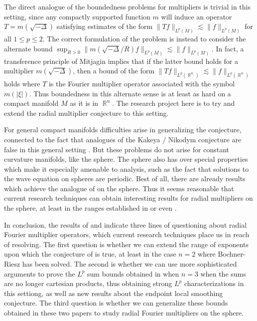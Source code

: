 \documentclass[12pt]{article}
\DeclareMathOperator{\RR}{\mathbb{R}}
\theoremstyle{plain}
\theoremstyle{remark}
\theoremstyle{definition}
\begin{document}
The direct analogue of the boundedness problems for multipliers is trivial in this setting, since any compactly supported function $m$ will induce an operator $T = m(\sqrt{-\Delta})$ satisfying estimates of the form $\| Tf \|_{L^p(M)} \lesssim \| f \|_{L^p(M)}$ for all $1 \leq p \leq 2$. The correct formulation of the problem is instead to consider the alternate bound $\sup_{R > 0} \| m(\sqrt{-\Delta}/R) f \|_{L^p(M)} \lesssim \| f \|_{L^p(M)}$. In fact, a transference principle of Mitjagin \cite{Mitjagin} implies that if the latter bound holds for a multiplier $m(\sqrt{-\Delta})$, then a bound of the form $\| Tf \|_{L^p(\RR^n)} \lesssim \| f \|_{L^p(\RR^n)}$ holds where $T$ is the Fourier multiplier operator associated with the symbol $m(|\xi|)$. Thus boundedness in this alternate sense is at least as hard on a compact manifold $M$ as it is in $\RR^n$. The research project here is to try and extend the radial multiplier conjecture to this setting.

For general compact manifolds difficulties arise in generalizing the conjecture, connected to the fact that analogues of the Kakeya / Nikodym conjecture are false in this general setting \cite{Minicozzi}. But these problems do not arise for constant curvature manifolds, like the sphere. The sphere also has over special properties which make it especially amenable to analysis, such as the fact that solutions to the wave equation on spheres are periodic. Best of all, there are already results which achieve the analogue of \cite{GarrigosandSeeger} on the sphere. Thus it seems reasonable that current research techniques can obtain interesting results for radial multipliers on the sphere, at least in the ranges established in \cite{HeoandNazarovandSeeger} or even \cite{Cladek}.

In conclusion, the results of \cite{HeoandNazarovandSeeger} and \cite{Cladek} indicate three lines of questioning about radial Fourier multiplier operators, which current research techniques place us in reach of resolving. The first question is whether we can extend the range of exponents upon which the conjecture of \cite{GarrigosandSeeger} is true, at least in the case $n = 2$ where Bochner-Riesz has been solved. The second is whether we can use more sophisticated arguments to prove the $L^p$ sum bounds obtained in \cite{Cladek} when $n = 3$ when the sums are no longer cartesian products, thus obtaining strong $L^p$ characterizations in this settiong, as well as new results about the endpoint local smoothing conjecture. The third question is whether we can generalize these bounds obtained in these two papers to study radial Fourier multipliers on the sphere. 
\end{document}
